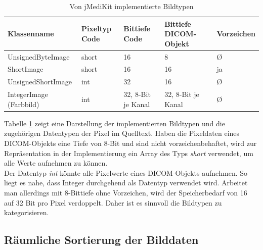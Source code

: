 \begin{table}
    \begin{tabularx}{\textwidth}{|p{5cm}|X|X|X|X|}
    \toprule
    \hline
    \textbf{Klassenname}         & \textbf{Pixeltyp Code}    & \textbf{Bittiefe Code}& \textbf{Bittiefe DICOM-Objekt} & \textbf{Vorzeichen} \\ \hline
    UnsignedByteImage 		 	& short					& 16 		  & 8 & \O \\ \hline
    ShortImage 		 			  & short				& 16 		  	  & 	16 & ja\\ \hline
    UnsignedShortImage						  & int		& 32 		  & 16 & \O \\ \hline
    IntegerImage (Farbbild)				      & int		& 32, 8-Bit je Kanal		  & 32, 8-Bit je Kanal & \O \\ \hline

    \bottomrule
    \end{tabularx}
    \caption {Von jMediKit implementierte Bildtypen}
    \label{java:bildtypen}
\end{table}

Tabelle \ref{java:bildtypen} zeigt eine Darstellung der implementierten Bildtypen und die zugehörigen Datentypen der Pixel im Quelltext. Haben die Pixeldaten eines DICOM-Objekts eine Tiefe von 8-Bit und sind nicht vorzeichenbehaftet, wird zur Repräsentation in der Implementierung ein Array des Typs \textit{short} verwendet, um alle Werte aufnehmen zu können.\\
Der Datentyp \textit{int} könnte alle Pixelwerte eines DICOM-Objekts aufnehmen. So liegt es nahe, dass Integer durchgehend als Datentyp verwendet wird. Arbeitet man allerdings mit 8-Bittiefe ohne Vorzeichen, wird der Speicherbedarf von 16 auf 32 Bit pro Pixel verdoppelt. Daher ist es sinnvoll die Bildtypen zu kategorisieren.

\subsection{Räumliche Sortierung der Bilddaten}

